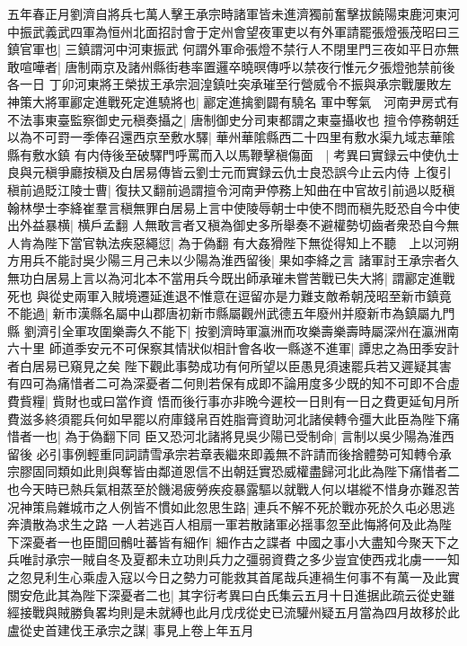 五年春正月劉濟自將兵七萬人擊王承宗時諸軍皆未進濟獨前奮擊拔饒陽束鹿河東河中振武義武四軍為恒州北面招討會于定州會望夜軍吏以有外軍請罷張燈張茂昭曰三鎮官軍也|{
	三鎮謂河中河東振武}
何謂外軍命張燈不禁行人不閉里門三夜如平日亦無敢喧嘩者|{
	唐制兩京及諸州縣街巷率置邏卒曉暝傳呼以禁夜行惟元夕張燈弛禁前後各一日}
丁卯河東將王榮拔王承宗洄湟鎮吐突承璀至行營威令不振與承宗戰屢敗左神策大將軍酈定進戰死定進驍將也|{
	酈定進擒劉闢有驍名}
軍中奪氣　河南尹房式有不法事東臺監察御史元稹奏攝之|{
	唐制御史分司東都謂之東臺攝收也}
擅令停務朝廷以為不可罸一季俸召還西京至敷水驛|{
	華州華隂縣西二十四里有敷水渠九域志華隂縣有敷水鎮}
有内侍後至破驛門呼罵而入以馬鞭擊稹傷面　|{
	考異曰實録云中使仇士良與元稹爭廳按稹及白居易傳皆云劉士元而實録云仇士良恐誤今止云内侍}
上復引稹前過貶江陵士曹|{
	復扶又翻前過謂擅令河南尹停務上知曲在中官故引前過以貶稹}
翰林學士李絳崔羣言稹無罪白居易上言中使陵辱朝士中使不問而稹先貶恐自今中使出外益暴横|{
	横戶孟翻}
人無敢言者又稹為御史多所舉奏不避權勢切齒者衆恐自今無人肯為陛下當官執法疾惡繩愆|{
	為于偽翻}
有大姦猾陛下無從得知上不聽　上以河朔方用兵不能討吳少陽三月己未以少陽為淮西留後|{
	果如李絳之言}
諸軍討王承宗者久無功白居易上言以為河北本不當用兵今既出師承璀未嘗苦戰已失大將|{
	謂酈定進戰死也}
與從史兩軍入賊境遷延進退不惟意在逗留亦是力難支敵希朝茂昭至新市鎮竟不能過|{
	新市漢縣名屬中山郡唐初新市縣屬觀州武德五年廢州并廢新市為鎮屬九門縣}
劉濟引全軍攻圍樂壽久不能下|{
	按劉濟時軍瀛洲而攻樂壽樂壽時屬深州在瀛洲南六十里}
師道季安元不可保察其情狀似相計會各收一縣遂不進軍|{
	譚忠之為田季安計者白居易已窺見之矣}
陛下觀此事勢成功有何所望以臣愚見須速罷兵若又遲疑其害有四可為痛惜者二可為深憂者二何則若保有成即不論用度多少既的知不可即不合虛費貲糧|{
	貲財也或曰當作資}
悟而後行事亦非晩今遲校一日則有一日之費更延旬月所費滋多終須罷兵何如早罷以府庫錢帛百姓脂膏資助河北諸侯轉令彊大此臣為陛下痛惜者一也|{
	為于偽翻下同}
臣又恐河北諸將見吳少陽已受制命|{
	言制以吳少陽為淮西留後}
必引事例輕重同詞請雪承宗若章表繼來即義無不許請而後捨體勢可知轉令承宗膠固同類如此則與奪皆由鄰道恩信不出朝廷實恐威權盡歸河北此為陛下痛惜者二也今天時已熱兵氣相蒸至於饑渇疲勞疾疫暴露驅以就戰人何以堪縱不惜身亦難忍苦况神策烏雜城市之人例皆不慣如此忽思生路|{
	連兵不解不死於戰亦死於久屯必思逃奔潰散為求生之路}
一人若逃百人相扇一軍若散諸軍必揺事忽至此悔將何及此為陛下深憂者一也臣聞回鶻吐蕃皆有細作|{
	細作古之諜者}
中國之事小大盡知今聚天下之兵唯討承宗一賊自冬及夏都未立功則兵力之彊弱資費之多少豈宜使西戎北虜一一知之忽見利生心乘虛入寇以今日之勢力可能救其首尾哉兵連禍生何事不有萬一及此實關安危此其為陛下深憂者二也|{
	其字衍考異曰白氏集云五月十日進据此疏云從史雖經接戰與賊勝負畧均則是未就縛也此月戊戌從史已流驩州疑五月當為四月故移於此}
盧從史首建伐王承宗之謀|{
	事見上卷上年五月}
